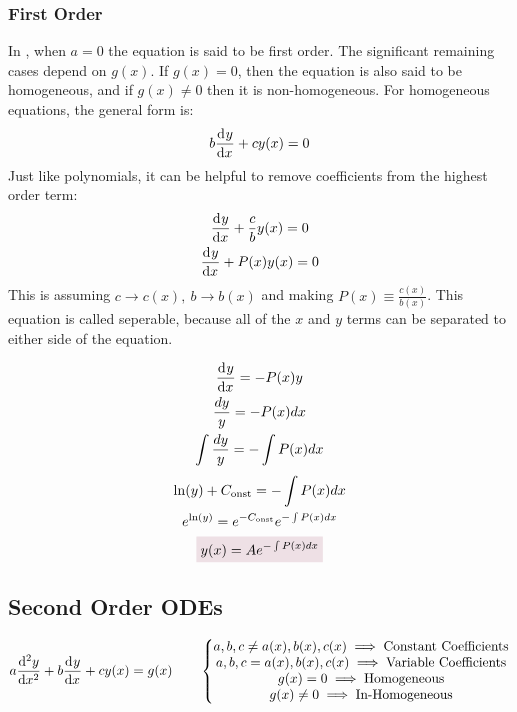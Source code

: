     \subsubsection{First Order}
        In , when $a=0$ the equation is said to be first order. The significant remaining cases depend on $g(x)$. If $g(x)=0$, then the equation is also said to be homogeneous, and if $g(x)\neq0$ then it is non-homogeneous. For homogeneous equations, the general form is:
        \begin{equation}
            b\der{y}{x}+cy(x)=0
        \end{equation}
        Just like polynomials, it can be helpful to remove coefficients from the highest order term:
        \begin{gather*}
            \der{y}{x}+\frac{c}{b}y(x)=0
            \\
            \der{y}{x}+P(x)y(x)=0
        \end{gather*}
        This is assuming $c\rightarrow c(x),~b\rightarrow b(x)$ and making $P(x)\equiv\frac{c(x)}{b(x)}$. This equation is called seperable, because all of the $x$ and $y$ terms can be separated to either side of the equation. 
        \begin{multicols}{2}\raggedcolumns
            {\length[0.25cm]
                \begin{gather*}
                    \der{y}{x}=-P(x)y
                    \\
                    \frac{dy}{y}=- P(x)dx
                    \\
                    \int\frac{dy}{y}=-\int P(x)dx
                \end{gather*}
            }   
            {\length[0.25cm]
                \begin{gather}
                \ln(y)+C_{\text{onst}}=-\int P(x)dx \notag
                \\
                e^{\ln(y)}=e^{-C_{\text{onst}}}e^{-\int P(x)dx} \notag
                \\
                \coloredanswer{y(x)=Ae^{-\int P(x)dx}}
            \end{gather}
            } 
        \end{multicols}
    \newpage
    
    

\subsection{Second Order ODEs}
        \begin{align*}
            a\der[2]{y}{x}+b\der{y}{x}+cy(x)=g(x)\quad\quad
            \left\{
            \begin{matrix}
                a,b,c\neq a(x),b(x),c(x) \implies\text{Constant Coefficients}\\
                a,b,c = a(x),b(x),c(x) \implies\text{Variable Coefficients}\\
                g(x)=0\implies\text{Homogeneous}\\
                g(x)\neq0\implies\text{In-Homogeneous}
            \end{matrix}
            \right.
        \end{align*}
